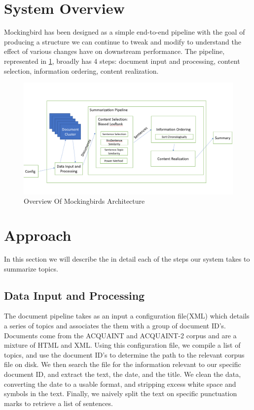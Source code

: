 \documentclass[11pt,a4paper]{article}
\begin{document}
\section{System Overview}
Mockingbird has been designed as a simple end-to-end pipeline with the goal of producing a structure we can continue to tweak and modify to understand the effect of various changes have on downstream performance. The pipeline, represented in \ref{fig:overview}, broadly has 4 steps: document input and processing, content selection, information ordering, content realization. \\
\begin{figure}[h]
  \includegraphics[width=\linewidth]{doc/overview.png}
  \caption{Overview Of Mockingbirds Architecture}
  \label{fig:overview}
\end{figure}
\section{Approach}
In this section we will describe the in detail each of the steps our system takes to summarize topics.
\subsection{Data Input and Processing}
The document pipeline takes as an input a configuration file(XML) which details a series of topics and associates the them with a group of document ID's. Documents come from the ACQUAINT and ACQUAINT-2 corpus and are a mixture of HTML and XML. Using this configuration file, we compile a list of topics, and use the document ID's to determine the path to the relevant corpus file on disk. We then search the file for the information relevant to our specific document ID, and extract the text, the date, and the title. We clean the data, converting the date to a usable format, and stripping excess white space and symbols in the text. Finally, we naively split the text on specific punctuation marks to retrieve a list of sentences. \\
\end{document}
